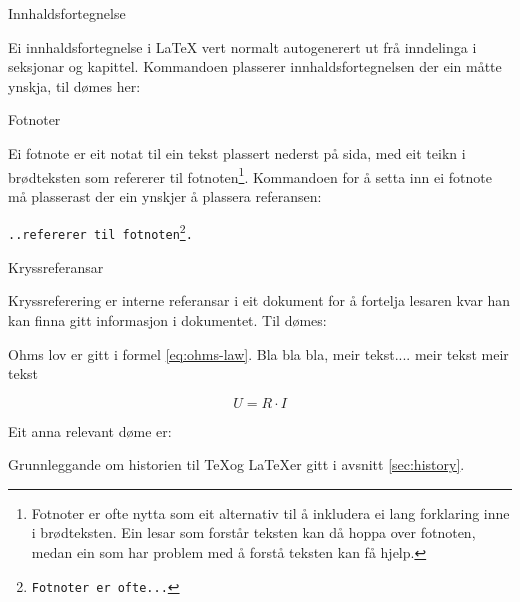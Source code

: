 	\begin{frame}{Innhaldsfortegnelse}
	
	Ei innhaldsfortegnelse i \LaTeX{} vert normalt autogenerert ut frå inndelinga i seksjonar og kapittel. Kommandoen \texttt{\tableofcontents} plasserer innhaldsfortegnelsen der ein måtte ynskja, til dømes her:
	
	\tableofcontents
\end{frame}

\begin{frame}{Fotnoter}
	
	Ei fotnote er eit notat til ein tekst plassert nederst på sida, med eit teikn i brødteksten som refererer til fotnoten\footnote{Fotnoter er ofte nytta som eit alternativ til å inkludera ei lang forklaring inne i brødteksten. Ein lesar som forstår teksten kan då hoppa over fotnoten, medan ein som har problem med å forstå teksten kan få hjelp.}. Kommandoen for å setta inn ei fotnote må plasserast der ein ynskjer å plassera referansen:
	
	\texttt{..refererer til fotnoten\footnote{Fotnoter er ofte...}.}
	
\end{frame}

\begin{frame}{Kryssreferansar}
	
	Kryssreferering er interne referansar i eit dokument for å fortelja lesaren kvar han kan finna gitt informasjon i dokumentet. Til dømes:
	
	\begin{displayquote}
		Ohms lov er gitt i formel \eqref{eq:ohms-law}. Bla bla bla, meir tekst.... meir tekst meir tekst
		
		\begin{equation}
			U = R \cdot I
			\label{eq:ohms-law}
		\end{equation}
		
	\end{displayquote}
	
	Eit anna relevant døme er:
	
	\begin{displayquote}
		Grunnleggande om historien til \TeX og \LaTeX er gitt i avsnitt \ref{sec:history}.
	\end{displayquote}
	
\end{frame}



